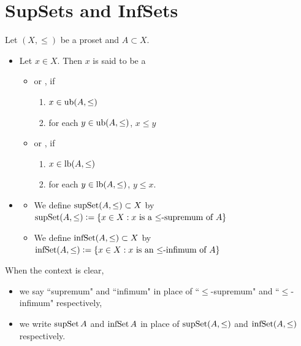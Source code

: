 \documentclass{book}
\begin{document}
	
	\newpage
	\section{SupSets and InfSets}
	
	\begin{defn} 
		Let $(X, \leq)$ be a proset and $A \subset X$.
		\begin{itemize}
			\item Let $x \in X$. Then $x$ is said to be a 
			\begin{itemize}
				\item {} or , if 
				\begin{enumerate}
					\item $x \in \operatorname{ub} (A, \leq)$
					\item for each $y \in \operatorname{ub} (A, \leq)$, $x \leq y$ 
				\end{enumerate}
				\item {} or , if 
				\begin{enumerate}
					\item $x \in \operatorname{lb} (A, \leq)$
					\item for each $y \in \operatorname{lb} (A, \leq)$, $y \leq x$. 
				\end{enumerate}
			\end{itemize}
			\item 
			\begin{itemize}
				\item We define $\operatorname{supSet} (A, \leq) \subset X$ by $\operatorname{supSet} (A, \leq) \vcentcolon= \{x \in X: \text{$x$ is a $\leq$-supremum of $A$}\}$
				\item We define $\operatorname{infSet} (A, \leq) \subset X$ by $\operatorname{infSet} (A, \leq) \vcentcolon= \{x \in X: \text{$x$ is an $\leq$-infimum of $A$}\}$
			\end{itemize}
		\end{itemize}
	\end{defn}
	
	\begin{note}
		When the context is clear, 
		\begin{itemize}
			\item we say ``supremum" and ``infimum" in place of ``$\leq$-supremum" and ``$\leq$-infimum" respectively,
			\item we write $\operatorname{supSet} A$ and $\operatorname{infSet} A$ in place of $\operatorname{supSet} (A, \leq)$ and $\operatorname{infSet} (A, \leq)$ respectively.
		\end{itemize}
	\end{note}
	
\end{document}
